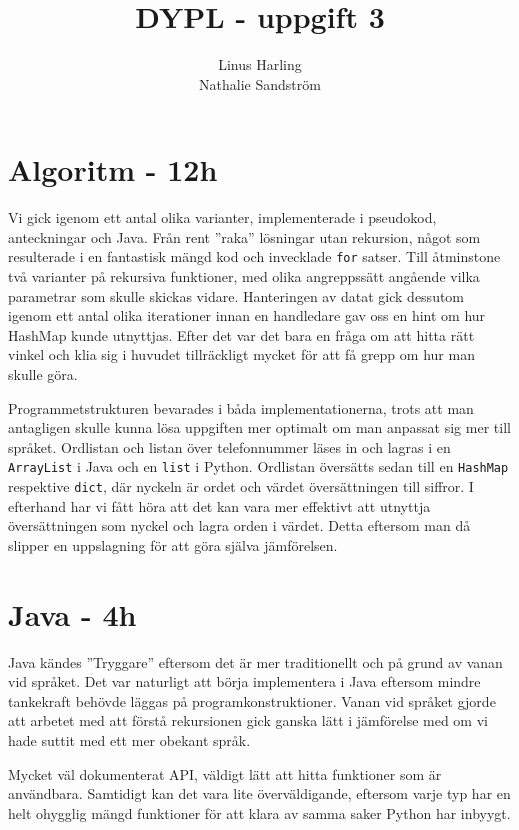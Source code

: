 \documentclass[a4paper, twoside, 11pt]{article}
\title{DYPL - uppgift 3}
\author{Linus Harling\\ Nathalie Sandström}
\begin{document}
\maketitle

\section{Algoritm - 12h}

Vi gick igenom ett antal olika varianter, implementerade i pseudokod, anteckningar och Java. Från rent ''raka'' lösningar utan rekursion, något som resulterade i en fantastisk mängd kod och invecklade \verb|for| satser. Till åtminstone två varianter på rekursiva funktioner, med olika angreppssätt angående vilka parametrar som skulle skickas vidare. Hanteringen av datat gick dessutom igenom ett antal olika iterationer innan en handledare gav oss en hint om hur HashMap kunde utnyttjas. Efter det var det bara en fråga om att hitta rätt vinkel och klia sig i huvudet tillräckligt mycket för att få grepp om hur man skulle göra.

Programmetstrukturen bevarades i båda implementationerna, trots att man antagligen skulle kunna lösa uppgiften mer optimalt om man anpassat sig mer till språket. Ordlistan och listan över telefonnummer läses in och lagras i en \verb|ArrayList| i Java och en \verb|list| i Python. Ordlistan översätts sedan till en \verb|HashMap| respektive \verb|dict|, där nyckeln är ordet och värdet översättningen till siffror. I efterhand har vi fått höra att det kan vara mer effektivt att utnyttja översättningen som nyckel och lagra orden i värdet. Detta eftersom man då slipper en uppslagning för att göra själva jämförelsen. 

\section{Java - 4h}

Java kändes ''Tryggare'' eftersom det är mer traditionellt och på grund av vanan vid språket. Det var naturligt att börja implementera i Java eftersom mindre tankekraft behövde läggas på programkonstruktioner. Vanan vid språket gjorde att arbetet med att förstå rekursionen gick ganska lätt i jämförelse med om vi hade suttit med ett mer obekant språk.

Mycket väl dokumenterat API, väldigt lätt att hitta funktioner som är användbara. Samtidigt kan det vara lite överväldigande, eftersom varje typ har en helt ohygglig mängd funktioner för att klara av samma saker Python har inbyygt.
\end{document}

